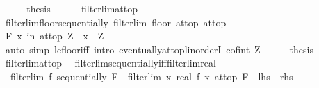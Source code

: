 \begin{isabellebody}
\ \ \isamarkupfalse%
\ \isamarkupfalse%
\ {\isacharquery}{\kern0pt}thesis\isanewline
\ \ \ \ \isamarkupfalse%
\ filterlim{\isacharunderscore}{\kern0pt}at{\isacharunderscore}{\kern0pt}top\ \isacommand{{\isachardot}{\kern0pt}{\isachardot}{\kern0pt}}\isamarkupfalse%
\isanewline
{}\isamarkupfalse%
%
\endisatagproof
{\isafoldproof}%
%
\isadelimproof
\isanewline
%
\endisadelimproof
\isanewline
{}\isamarkupfalse%
\ filterlim{\isacharunderscore}{\kern0pt}floor{\isacharunderscore}{\kern0pt}sequentially{\isacharcolon}{\kern0pt}\ {\isachardoublequoteopen}filterlim\ floor\ at{\isacharunderscore}{\kern0pt}top\ at{\isacharunderscore}{\kern0pt}top{\isachardoublequoteclose}\isanewline
%
\isadelimproof
%
\endisadelimproof
%
\isatagproof
{}\isamarkupfalse%
\ {\isacharminus}{\kern0pt}\isanewline
\ \ \isamarkupfalse%
\ {\isachardoublequoteopen}{\isasymforall}\isactrlsub F\ x\ in\ at{\isacharunderscore}{\kern0pt}top{\isachardot}{\kern0pt}\ Z\ {\isasymle}\ {\isasymlfloor}x{\isasymrfloor}{\isachardoublequoteclose}\ \ Z\isanewline
\ \ \ \ \isamarkupfalse%
\ {\isacharparenleft}{\kern0pt}auto\ simp{\isacharcolon}{\kern0pt}\ le{\isacharunderscore}{\kern0pt}floor{\isacharunderscore}{\kern0pt}iff\ intro{\isacharbang}{\kern0pt}{\isacharcolon}{\kern0pt}\ eventually{\isacharunderscore}{\kern0pt}at{\isacharunderscore}{\kern0pt}top{\isacharunderscore}{\kern0pt}linorderI{\isacharbrackleft}{\kern0pt}\ c{\isacharequal}{\kern0pt}{\isachardoublequoteopen}of{\isacharunderscore}{\kern0pt}int\ Z{\isachardoublequoteclose}{\isacharbrackright}{\kern0pt}{\isacharparenright}{\kern0pt}\isanewline
\ \ \isamarkupfalse%
\ \isamarkupfalse%
\ {\isacharquery}{\kern0pt}thesis\isanewline
\ \ \ \ \isamarkupfalse%
\ filterlim{\isacharunderscore}{\kern0pt}at{\isacharunderscore}{\kern0pt}top\ \isacommand{{\isachardot}{\kern0pt}{\isachardot}{\kern0pt}}\isamarkupfalse%
\isanewline
{}\isamarkupfalse%
%
\endisatagproof
{\isafoldproof}%
%
\isadelimproof
\isanewline
%
\endisadelimproof
\isanewline
{}\isamarkupfalse%
\ filterlim{\isacharunderscore}{\kern0pt}sequentially{\isacharunderscore}{\kern0pt}iff{\isacharunderscore}{\kern0pt}filterlim{\isacharunderscore}{\kern0pt}real{\isacharcolon}{\kern0pt}\isanewline
\ \ {\isachardoublequoteopen}filterlim\ f\ sequentially\ F\ {\isasymlongleftrightarrow}\ filterlim\ {\isacharparenleft}{\kern0pt}{\isasymlambda}x{\isachardot}{\kern0pt}\ real\ {\isacharparenleft}{\kern0pt}f\ x{\isacharparenright}{\kern0pt}{\isacharparenright}{\kern0pt}\ at{\isacharunderscore}{\kern0pt}top\ F{\isachardoublequoteclose}\ {\isacharparenleft}{\kern0pt}\ {\isachardoublequoteopen}{\isacharquery}{\kern0pt}lhs\ {\isacharequal}{\kern0pt}\ {\isacharquery}{\kern0pt}rhs{\isachardoublequoteclose}{\isacharparenright}{\kern0pt}\isanewline

\end{isabellebody}
